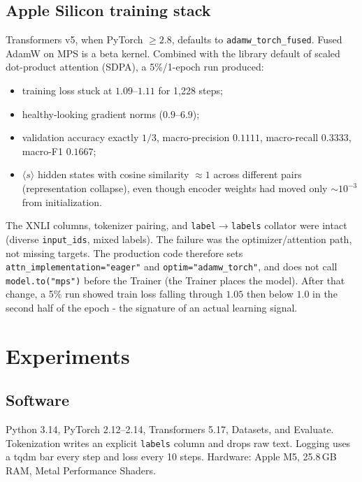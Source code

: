 \documentclass[conference]{IEEEtran}
\begin{document}
\subsection{Apple Silicon training stack}
Transformers v5, when PyTorch $\geq 2.8$, defaults to \texttt{adamw\_torch\_fused}. Fused AdamW on MPS is a beta kernel. Combined with the library default of scaled dot-product attention (SDPA), a 5\%/1-epoch run produced:
\begin{itemize}
  \item training loss stuck at $1.09$--$1.11$ for 1{,}228 steps;
  \item healthy-looking gradient norms ($0.9$--$6.9$);
  \item validation accuracy exactly $1/3$, macro-precision $0.1111$, macro-recall $0.3333$, macro-F1 $0.1667$;
  \item $\langle s\rangle$ hidden states with cosine similarity $\approx 1$ across different pairs (representation collapse), even though encoder weights had moved only $\sim 10^{-3}$ from initialization.
\end{itemize}
The XNLI columns, tokenizer pairing, and \texttt{label}$\rightarrow$\texttt{labels} collator were intact (diverse \texttt{input\_ids}, mixed labels). The failure was the optimizer/attention path, not missing targets. The production code therefore sets \texttt{attn\_implementation="eager"} and \texttt{optim="adamw\_torch"}, and does not call \texttt{model.to("mps")} before the Trainer (the Trainer places the model). After that change, a 5\% run showed train loss falling through $1.05$ then below $1.0$ in the second half of the epoch - the signature of an actual learning signal.

\section{Experiments}
\label{sec:exp}

\subsection{Software}
Python 3.14, PyTorch 2.12--2.14, Transformers 5.17, Datasets, and Evaluate. Tokenization writes an explicit \texttt{labels} column and drops raw text. Logging uses a tqdm bar every step and loss every 10 steps. Hardware: Apple M5, 25.8\,GB RAM, Metal Performance Shaders.
\end{document}
